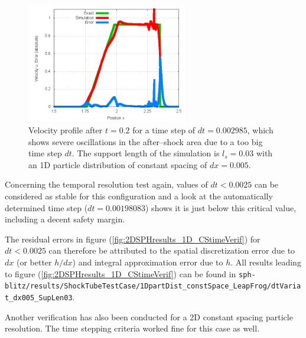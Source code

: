 \documentclass[11pt,a4paper,twoside]{report}
\begin{document}
\begin{figure}[!htbp]

\centering
\label{fig:2DSPHresults_dt_variat_oscillationU}
\includegraphics[width=7cm]{Graphics/results/ShockTube/1D_CS_LF_SD/dtVariat_dx005_SupLen03_dt03_Oscillations/Err_u00200000}
\caption[Velocity oscillations due to temporal instability]{Velocity profile after $t=0.2$ for a time step of $dt=0.002985$, which shows severe oscillations in the after--shock area due to a too big time step $dt$. The support length of the simulation is $l_s=0.03$ with an 1D particle distribution of constant spacing of $dx=0.005$.}

\end{figure}

Concerning the temporal resolution test again, values of $dt<0.0025$ can be considered as stable for this configuration and a look at the automatically determined time step ($dt=0.00198083$) shows it is just below this critical value, including a decent safety margin.

The residual errors in figure (\ref{fig:2DSPHresults_1D_CStimeVerif}) for $dt<0.0025$ can therefore be attributed to the spatial discretization error due to $dx$ (or better $h/dx$) and integral approximation error due to $h$. All results leading to figure (\ref{fig:2DSPHresults_1D_CStimeVerif}) can be found in {\tt sph-blitz/results/ShockTubeTestCase/1DpartDist\_constSpace\_LeapFrog/dtVariat\_dx005\_SupLen03}.

Another verification has also been conducted for a 2D constant spacing particle resolution. The time stepping criteria worked fine for this case as well. 
\end{document}
